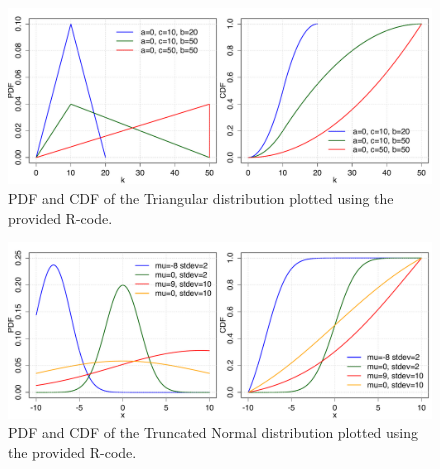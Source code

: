 \begin{figure}[htb!]
\centering
  \includegraphics[width=140mm]{pics/Triangular_pmf_cdf.pdf}
 \caption{PDF and CDF of the Triangular distribution plotted using the provided R-code.}
 \label{fig:Triangular_pmf_cdf}
\end{figure}

\begin{figure}[htb!]
\centering
  \includegraphics[width=140mm]{pics/TruncatedNormal_pdf_cdf.pdf}
 \caption{PDF and CDF of the Truncated Normal distribution plotted using the provided R-code.}
 \label{fig:TruncatedNormal_pdf_cdf}
\end{figure}


